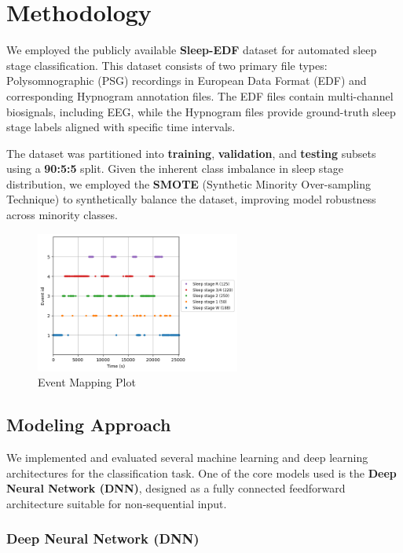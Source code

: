 \section{Methodology}



We employed the publicly available \textbf{Sleep-EDF} dataset for automated sleep stage classification. This dataset consists of two primary file types: Polysomnographic (PSG) recordings in European Data Format (EDF) and corresponding Hypnogram annotation files. The EDF files contain multi-channel biosignals, including EEG, while the Hypnogram files provide ground-truth sleep stage labels aligned with specific time intervals.



The dataset was partitioned into \textbf{training}, \textbf{validation}, and \textbf{testing} subsets using a \textbf{90:5:5} split. Given the inherent class imbalance in sleep stage distribution, we employed the \textbf{SMOTE} (Synthetic Minority Over-sampling Technique) to synthetically balance the dataset, improving model robustness across minority classes.


\begin{figure}[H]
	\centering
	\includegraphics[width=0.60\textwidth]{img/paper_2/sleep event.PNG}
	\caption{Event Mapping Plot}
	\label{fig:lstm_accuracy}
\end{figure}


\subsection{Modeling Approach}

We implemented and evaluated several machine learning and deep learning architectures for the classification task. One of the core models used is the \textbf{Deep Neural Network (DNN)}, designed as a fully connected feedforward architecture suitable for non-sequential input.

\subsubsection{Deep Neural Network (DNN)}


